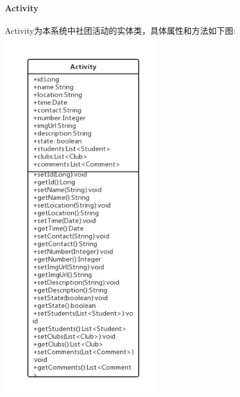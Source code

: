 \documentclass[UTF8]{ctexart}
\begin{document}
\paragraph{Activity}
Activity为本系统中社团活动的实体类，具体属性和方法如下图:
\newline
\includegraphics[width = 0.5\textwidth]{activity-class.png}
\newline
\end{document}
